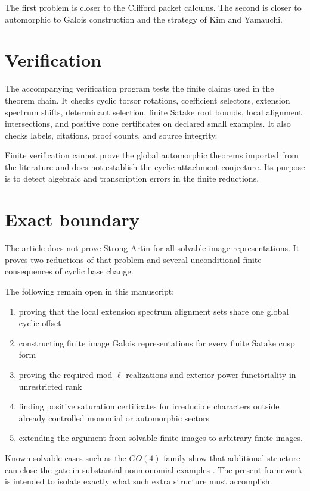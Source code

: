 \documentclass{aomart}
\theoremstyle{definition}
\theoremstyle{remark}
\begin{document}
The first problem is closer to the Clifford packet calculus. The second is closer to automorphic to Galois construction and the strategy of Kim and Yamauchi.

\section{Verification}\label{sec:verification}

The accompanying verification program tests the finite claims used in the theorem chain. It checks cyclic torsor rotations, coefficient selectors, extension spectrum shifts, determinant selection, finite Satake root bounds, local alignment intersections, and positive cone certificates on declared small examples. It also checks labels, citations, proof counts, and source integrity.

Finite verification cannot prove the global automorphic theorems imported from the literature and does not establish the cyclic attachment conjecture. Its purpose is to detect algebraic and transcription errors in the finite reductions.

\section{Exact boundary}\label{sec:boundary}

The article does not prove Strong Artin for all solvable image representations. It proves two reductions of that problem and several unconditional finite consequences of cyclic base change.

The following remain open in this manuscript:

\begin{enumerate}
\item proving that the local extension spectrum alignment sets share one global cyclic offset
\item constructing finite image Galois representations for every finite Satake cusp form
\item proving the required mod \(\ell\) realizations and exterior power functoriality in unrestricted rank
\item finding positive saturation certificates for irreducible characters outside already controlled monomial or automorphic sectors
\item extending the argument from solvable finite images to arbitrary finite images.
\end{enumerate}

Known solvable cases such as the \(GO(4)\) family show that additional structure can close the gate in substantial nonmonomial examples \cite{Ramakrishnan2002}. The present framework is intended to isolate exactly what such extra structure must accomplish.
\end{document}
